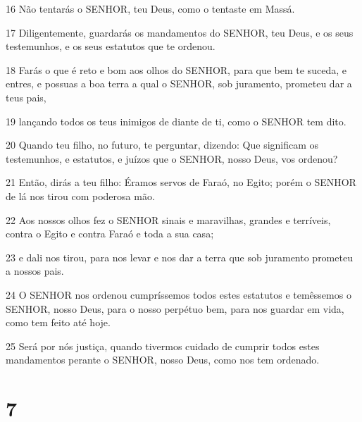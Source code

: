 \par 16 Não tentarás o SENHOR, teu Deus, como o tentaste em Massá.
\par 17 Diligentemente, guardarás os mandamentos do SENHOR, teu Deus, e os seus testemunhos, e os seus estatutos que te ordenou.
\par 18 Farás o que é reto e bom aos olhos do SENHOR, para que bem te suceda, e entres, e possuas a boa terra a qual o SENHOR, sob juramento, prometeu dar a teus pais,
\par 19 lançando todos os teus inimigos de diante de ti, como o SENHOR tem dito.
\par 20 Quando teu filho, no futuro, te perguntar, dizendo: Que significam os testemunhos, e estatutos, e juízos que o SENHOR, nosso Deus, vos ordenou?
\par 21 Então, dirás a teu filho: Éramos servos de Faraó, no Egito; porém o SENHOR de lá nos tirou com poderosa mão.
\par 22 Aos nossos olhos fez o SENHOR sinais e maravilhas, grandes e terríveis, contra o Egito e contra Faraó e toda a sua casa;
\par 23 e dali nos tirou, para nos levar e nos dar a terra que sob juramento prometeu a nossos pais.
\par 24 O SENHOR nos ordenou cumpríssemos todos estes estatutos e temêssemos o SENHOR, nosso Deus, para o nosso perpétuo bem, para nos guardar em vida, como tem feito até hoje.
\par 25 Será por nós justiça, quando tivermos cuidado de cumprir todos estes mandamentos perante o SENHOR, nosso Deus, como nos tem ordenado.

\chapter{7}


